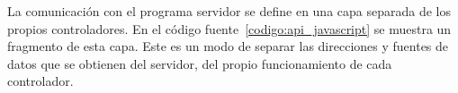 La comunicación con el programa servidor se define en una capa separada de los
propios controladores. En el código fuente~\ref{codigo:api_javascript} se
muestra un fragmento de esta capa. Este es un modo de separar las direcciones y
fuentes de datos que se obtienen del servidor, del propio funcionamiento de
cada controlador.


